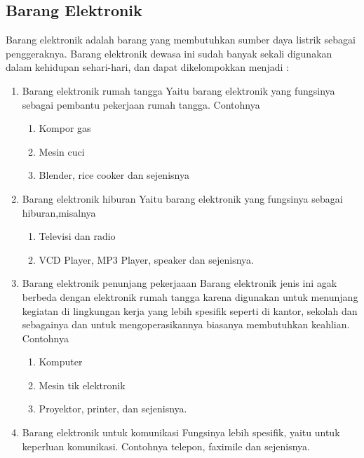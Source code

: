 \documentclass{article}
\begin{document}
\subsection{Barang Elektronik}
Barang elektronik adalah barang yang membutuhkan sumber daya listrik sebagai penggeraknya. Barang elektronik dewasa ini sudah banyak sekali digunakan dalam kehidupan sehari-hari, dan dapat dikelompokkan menjadi :
\begin{enumerate}
    \item Barang elektronik rumah tangga \newline
    Yaitu barang elektronik yang fungsinya sebagai pembantu pekerjaan rumah tangga. Contohnya
    \begin{enumerate}
        \item Kompor gas
        \item Mesin cuci
        \item Blender, rice cooker dan sejenisnya
    \end{enumerate}
    \item Barang elektronik hiburan \newline
     Yaitu barang elektronik yang fungsinya sebagai hiburan,misalnya
    \begin{enumerate}
        \item Televisi dan radio
        \item VCD Player, MP3 Player, speaker dan sejenisnya.
\end{enumerate}
    \item Barang elektronik penunjang pekerjaaan \newline Barang elektronik jenis ini agak berbeda dengan elektronik rumah tangga karena digunakan untuk menunjang kegiatan di lingkungan kerja yang lebih spesifik seperti di kantor, sekolah dan sebagainya dan untuk mengoperasikannya biasanya membutuhkan keahlian. Contohnya
    \begin{enumerate}
        \item Komputer
        \item Mesin tik elektronik
        \item Proyektor, printer, dan sejenisnya.
    \end{enumerate}
    \item Barang elektronik untuk komunikasi \newline
    Fungsinya lebih spesifik, yaitu untuk keperluan komunikasi. Contohnya telepon, faximile dan sejenisnya.
\end{enumerate}
\end{document}
